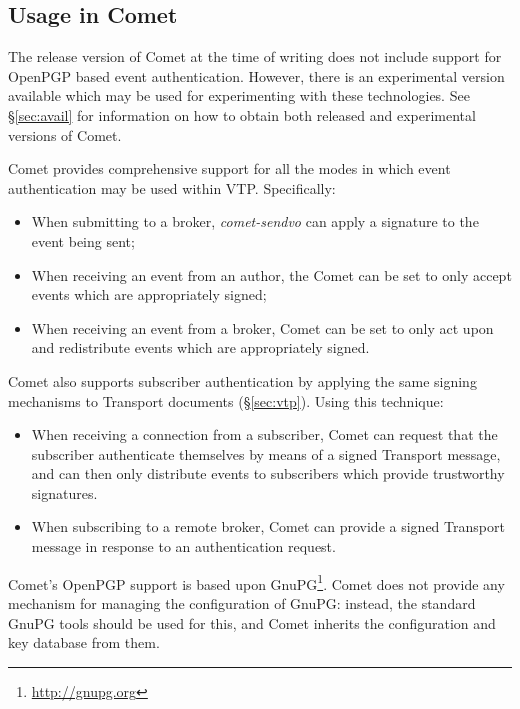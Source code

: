 \documentclass[5p,authoryear]{elsarticle}
\begin{document}
\subsection{Usage in Comet}

The release version of Comet at the time of writing does not include support
for OpenPGP based event authentication. However, there is an experimental
version available which may be used for experimenting with these technologies.
See \S\ref{sec:avail} for information on how to obtain both released and
experimental versions of Comet.

Comet provides comprehensive support for all the modes in which event
authentication may be used within VTP. Specifically:

\begin{itemize}

  \item{When submitting to a broker, \textit{comet-sendvo} can apply a
  signature to the event being sent;}

  \item{When receiving an event from an author, the Comet can be set to
  only accept events which are appropriately signed;}

  \item{When receiving an event from a broker, Comet can be set to only act
  upon and redistribute events which are appropriately signed.}

\end{itemize}

Comet also supports subscriber authentication by applying the same signing
mechanisms to Transport documents (\S\ref{sec:vtp}). Using this technique:

\begin{itemize}

  \item{When receiving a connection from a subscriber, Comet can request that
  the subscriber authenticate themselves by means of a signed Transport
  message, and can then only distribute events to subscribers which provide
  trustworthy signatures.}

  \item{When subscribing to a remote broker, Comet can provide a signed
  Transport message in response to an authentication request.}

\end{itemize}


Comet's OpenPGP support is based upon GnuPG\footnote{\url{http://gnupg.org}}.
Comet does not provide any mechanism for managing the configuration of GnuPG:
instead, the standard GnuPG tools should be used for this, and Comet inherits
the configuration and key database from them.
\end{document}
